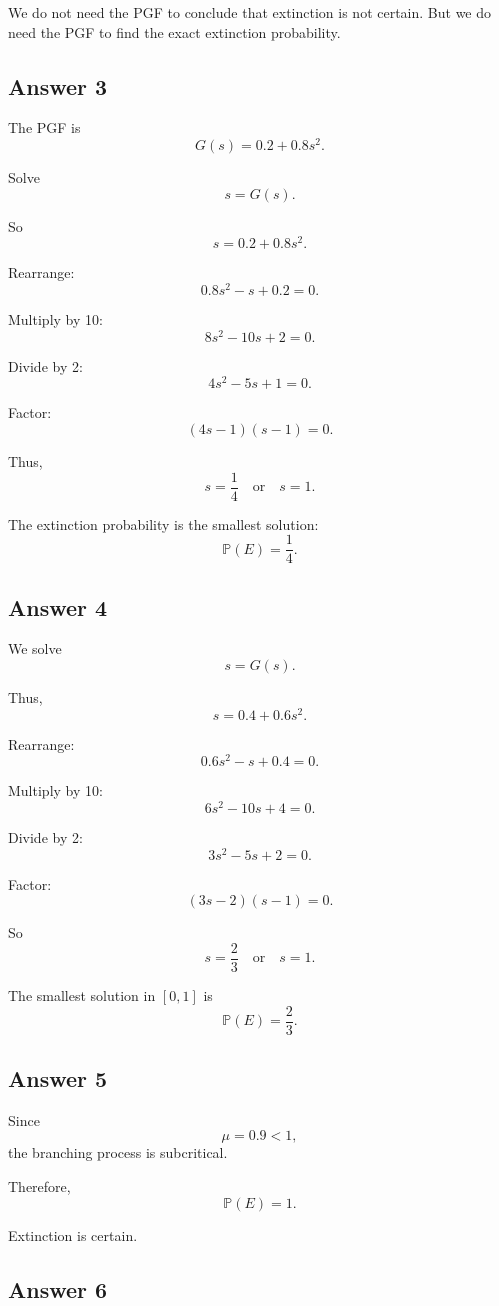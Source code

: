 \documentclass[12pt,a4paper]{article}
\theoremstyle{notestyle}
\newcommand{\Prob}{\mathbb{P}}
\begin{document}
We do not need the PGF to conclude that extinction is not certain. But we do need the PGF to find the exact extinction probability.

\subsection*{Answer 3}

The PGF is
\[
G(s)=0.2+0.8s^2.
\]

Solve
\[
s=G(s).
\]

So
\[
s=0.2+0.8s^2.
\]

Rearrange:
\[
0.8s^2-s+0.2=0.
\]

Multiply by 10:
\[
8s^2-10s+2=0.
\]

Divide by 2:
\[
4s^2-5s+1=0.
\]

Factor:
\[
(4s-1)(s-1)=0.
\]

Thus,
\[
s=\frac14
\quad\text{or}\quad
s=1.
\]

The extinction probability is the smallest solution:
\[
\boxed{\Prob(E)=\frac14.}
\]

\subsection*{Answer 4}

We solve
\[
s=G(s).
\]

Thus,
\[
s=0.4+0.6s^2.
\]

Rearrange:
\[
0.6s^2-s+0.4=0.
\]

Multiply by 10:
\[
6s^2-10s+4=0.
\]

Divide by 2:
\[
3s^2-5s+2=0.
\]

Factor:
\[
(3s-2)(s-1)=0.
\]

So
\[
s=\frac23
\quad\text{or}\quad
s=1.
\]

The smallest solution in $[0,1]$ is
\[
\boxed{\Prob(E)=\frac23.}
\]

\subsection*{Answer 5}

Since
\[
\mu=0.9<1,
\]
the branching process is subcritical.

Therefore,
\[
\boxed{\Prob(E)=1.}
\]

Extinction is certain.

\subsection*{Answer 6}
\end{document}
